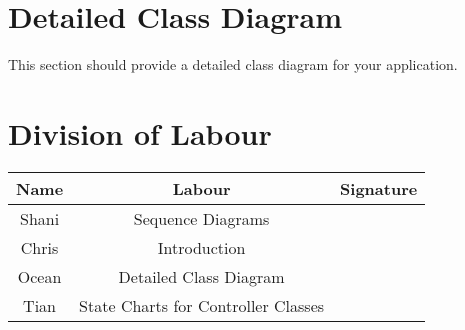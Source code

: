 \documentclass[]{article}
\begin{document}
\section{Detailed Class Diagram}
\label{sec:detailed_class_diagram}
This section should provide a detailed class diagram for your application.

\appendix
\section{Division of Labour}
\label{sec:division_of_labour}
\begin{center}
\begin{tabular}{ |c|c|c| }
 \hline
 Name & Labour & Signature \\ \hline
 Shani & Sequence Diagrams & \\
 Chris & Introduction  &  \\
 Ocean &  Detailed Class Diagram &  \\
 Tian & State Charts for Controller Classes & \\
 \hline
\end{tabular}
\end{center}
\end{document}
